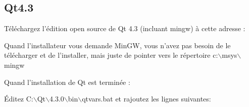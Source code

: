 %
%
%
%

\subsection{Qt4.3}
T\'el\'echargez l'\'edition open source de Qt 4.3 (incluant mingw) \`a cette adresse : 


Quand l'installateur vous demande MinGW, vous n'avez pas besoin de le
t\'el\'echarger et de l'installer, mais juste de pointer vers le r\'epertoire
c:$\backslash$msys$\backslash$mingw

Quand l'installation de Qt est termin\'ee :

\'Editez C:$\backslash$Qt$\backslash$4.3.0$\backslash$bin$\backslash$qtvars.bat et
rajoutez les lignes suivantes:

%
%

